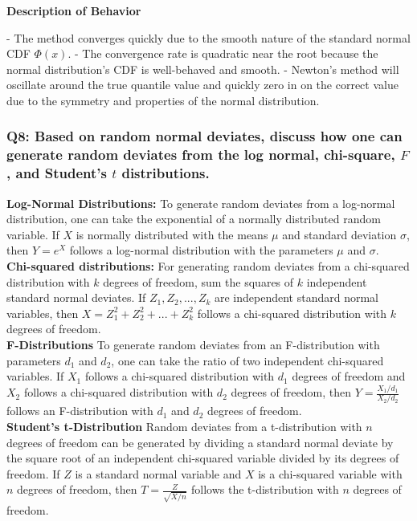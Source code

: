 \documentclass[8pt]{article}
\begin{document}
\textbf{Description of Behavior}

- The method converges quickly due to the smooth nature of the standard normal CDF \( \Phi(x) \).
- The convergence rate is quadratic near the root because the normal distribution's CDF is well-behaved and smooth.
- Newton's method will oscillate around the true quantile value and quickly zero in on the correct value due to the symmetry and properties of the normal distribution.


\subsubsection*{Q8:
Based on random normal deviates, discuss how one can generate random deviates from the log normal, chi-square, \(F\), and Student’s \(t\) distributions.}

\textbf{Log-Normal Distributions:}
To generate random deviates from a log-normal distribution, one can take the exponential of a normally distributed random variable. If $X$ is normally distributed with the means $\mu$ and standard deviation $\sigma$, then $Y = e^{X}$ follows a log-normal distribution with the parameters $\mu$ and $\sigma$. \\ 

\textbf{Chi-squared distributions:} For generating random deviates from a chi-squared distribution with $k$
degrees of freedom, sum the squares of $k$ independent standard normal deviates. If $Z_1, Z_2,...,Z_k$ are independent standard normal variables, then $X = Z_1^2 +  Z_2^2+...+Z_k^2$ follows a chi-squared distribution with $k$ degrees of freedom. \\

\textbf{F-Distributions} To generate random deviates from an F-distribution with parameters $d_1$ and $d_2$, one can take the ratio of two independent chi-squared variables. If $X_1$ follows a chi-squared distribution with $d_1$ degrees of freedom and $X_2$ follows a chi-squared distribution with $d_2$ degrees of freedom, then $Y = \frac{X_1/d_1}{X_2/d_2}$ follows an F-distribution with $d_1$ and $d_2$ degrees of freedom. \\

\textbf{Student's t-Distribution} Random deviates from a t-distribution with $n$ degrees of freedom can be generated by dividing a standard normal deviate by the square root of an independent chi-squared variable divided by its degrees of freedom. If $Z$ is a standard normal variable and $X$ is a chi-squared variable with $n$ degrees of freedom, then $T= \frac{Z}{\sqrt{X/n}}$ follows the t-distribution with $n$ degrees of freedom. \\
\end{document}
